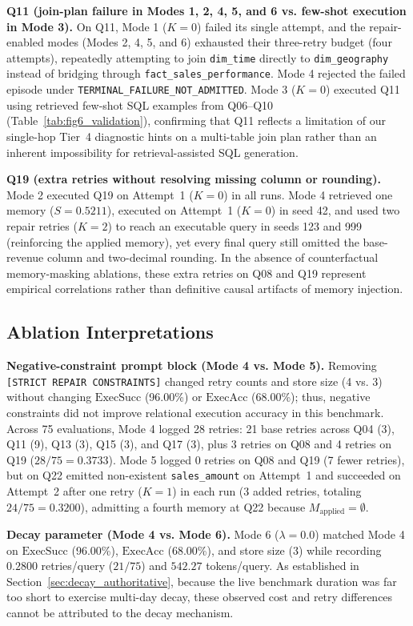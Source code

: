 \textbf{Q11 (join-plan failure in Modes 1, 2, 4, 5, and 6 vs. few-shot execution in Mode 3).} On Q11, Mode 1 ($K=0$) failed its single attempt, and the repair-enabled modes (Modes 2, 4, 5, and 6) exhausted their three-retry budget (four attempts), repeatedly attempting to join \texttt{dim\_time} directly to \texttt{dim\_geography} instead of bridging through \texttt{fact\_sales\_performance}. Mode 4 rejected the failed episode under \texttt{TERMINAL\_FAILURE\_NOT\_ADMITTED}. Mode 3 ($K=0$) executed Q11 using retrieved few-shot SQL examples from Q06--Q10 (Table~\ref{tab:fig6_validation}), confirming that Q11 reflects a limitation of our single-hop Tier~4 diagnostic hints on a multi-table join plan rather than an inherent impossibility for retrieval-assisted SQL generation.

\textbf{Q19 (extra retries without resolving missing column or rounding).} Mode 2 executed Q19 on Attempt~1 ($K=0$) in all runs. Mode 4 retrieved one memory ($S = 0.5211$), executed on Attempt~1 ($K=0$) in seed 42, and used two repair retries ($K=2$) to reach an executable query in seeds 123 and 999 (reinforcing the applied memory), yet every final query still omitted the base-revenue column and two-decimal rounding. In the absence of counterfactual memory-masking ablations, these extra retries on Q08 and Q19 represent empirical correlations rather than definitive causal artifacts of memory injection.

\subsection{Ablation Interpretations}
\label{sec:ablation}
\textbf{Negative-constraint prompt block (Mode 4 vs. Mode 5).} Removing \texttt{[STRICT REPAIR CONSTRAINTS]} changed retry counts and store size (4 vs. 3) without changing $\text{ExecSucc}$ (96.00\%) or $\text{ExecAcc}$ (68.00\%); thus, negative constraints did not improve relational execution accuracy in this benchmark. Across 75 evaluations, Mode 4 logged 28 retries: 21 base retries across Q04 (3), Q11 (9), Q13 (3), Q15 (3), and Q17 (3), plus 3 retries on Q08 and 4 retries on Q19 ($28/75 = 0.3733$). Mode 5 logged 0 retries on Q08 and Q19 (7 fewer retries), but on Q22 emitted non-existent \texttt{sales\_amount} on Attempt~1 and succeeded on Attempt~2 after one retry ($K=1$) in each run (3 added retries, totaling $24/75 = 0.3200$), admitting a fourth memory at Q22 because $M_{\text{applied}} = \emptyset$.

\textbf{Decay parameter (Mode 4 vs. Mode 6).} Mode 6 ($\lambda = 0.0$) matched Mode 4 on $\text{ExecSucc}$ (96.00\%), $\text{ExecAcc}$ (68.00\%), and store size (3) while recording $0.2800$ retries/query ($21/75$) and $542.27$ tokens/query. As established in Section~\ref{sec:decay_authoritative}, because the live benchmark duration was far too short to exercise multi-day decay, these observed cost and retry differences cannot be attributed to the decay mechanism.

